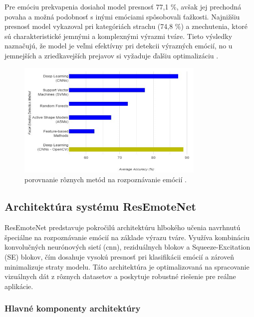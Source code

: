 Pre emóciu prekvapenia dosiahol model presnosť 77,1 \%, avšak jej prechodná povaha a možná podobnosť s inými emóciami spôsobovali ťažkosti. Najnižšiu presnosť 
model vykazoval pri kategóriách strachu (74,8 \%) a znechutenia, ktoré sú charakteristické jemnými a komplexnými výrazmi tváre. Tieto výsledky naznačujú,
že model je veľmi efektívny pri detekcii výrazných emócií, no u jemnejších a zriedkavejších prejavov si vyžaduje ďalšiu optimalizáciu \cite{inProceedings02}.
\begin{figure}[!htpb]
    \centering
    \includegraphics[width=0.8\textwidth]{img/comparation.png}
    \caption{porovnanie rôznych metód na rozpoznávanie emócií \cite{inProceedings02}.}
    \label{fig:comparation}
\end{figure}
\newpage
\subsection{Architektúra systému ResEmoteNet}

ResEmoteNet predstavuje pokročilú architektúru hlbokého učenia navrhnutú špeciálne na rozpoznávanie emócií na základe výrazu tváre. Využíva kombináciu konvolučných neurónových sietí (\gls{cnn}), reziduálnych blokov a Squeeze-Excitation (SE) blokov, čím dosahuje vysokú presnosť pri klasifikácii emócií a zároveň minimalizuje straty modelu. Táto architektúra je optimalizovaná na spracovanie vizuálnych dát z rôznych datasetov a poskytuje robustné riešenie pre reálne aplikácie.

\subsubsection{Hlavné komponenty architektúry}


